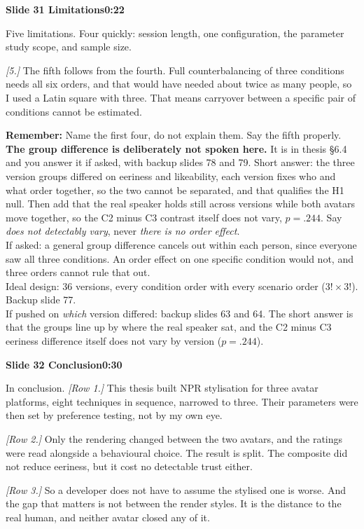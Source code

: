 \documentclass[11pt,a4paper]{article}
\newcommand{\slidehead}[3]{%
  \needspace{5\baselineskip}
  \vspace{0.9em}
  \noindent\colorbox{knblue}{\parbox{0.978\textwidth}{\vspace{1pt}\color{white}\textbf{Slide #1 \quad #2}\hfill\textbf{#3}\vspace{1pt}}}
  \vspace{0.35em}\par}
\newcommand{\remind}[1]{%
  \vspace{0.15em}
  \noindent\colorbox{knlight}{\parbox{0.972\textwidth}{\small\color{knblue}\textbf{Remember:} #1}}
  \vspace{0.2em}\par}
\newcommand{\pointto}[1]{{\color{knaccent}\textit{[#1]}}}
\begin{document}
\slidehead{31}{Limitations}{0:22}

Five limitations. Four quickly: session length, one configuration, the parameter study scope, and sample size.

\pointto{5.} The fifth follows from the fourth. Full counterbalancing of three conditions needs all six orders, and that would have needed about twice as many people, so I used a Latin square with three. That means carryover between a specific pair of conditions cannot be estimated.

\remind{Name the first four, do not explain them. Say the fifth properly.\\[0.4em] \textbf{The group difference is deliberately not spoken here.} It is in thesis §6.4 and you answer it if asked, with backup slides 78 and 79. Short answer: the three version groups differed on eeriness and likeability, each version fixes who and what order together, so the two cannot be separated, and that qualifies the H1 null. Then add that the real speaker holds still across versions while both avatars move together, so the C2 minus C3 contrast itself does not vary, $p=.244$. Say \emph{does not detectably vary}, never \emph{there is no order effect}.\\[0.4em] If asked: a general group difference cancels out within each person, since everyone saw all three conditions. An order effect on one specific condition would not, and three orders cannot rule that out.\\[0.4em] Ideal design: 36 versions, every condition order with every scenario order ($3!\times3!$). Backup slide 77.\\[0.4em] If pushed on \emph{which} version differed: backup slides 63 and 64. The short answer is that the groups line up by where the real speaker sat, and the C2 minus C3 eeriness difference itself does not vary by version ($p=.244$).}

\slidehead{32}{Conclusion}{0:30}

In conclusion. \pointto{Row 1.} This thesis built NPR stylisation for three avatar platforms, eight techniques in sequence, narrowed to three. Their parameters were then set by preference testing, not by my own eye.

\pointto{Row 2.} Only the rendering changed between the two avatars, and the ratings were read alongside a behavioural choice. The result is split. The composite did not reduce eeriness, but it cost no detectable trust either.

\pointto{Row 3.} So a developer does not have to assume the stylised one is worse. And the gap that matters is not between the render styles. It is the distance to the real human, and neither avatar closed any of it.
\end{document}
